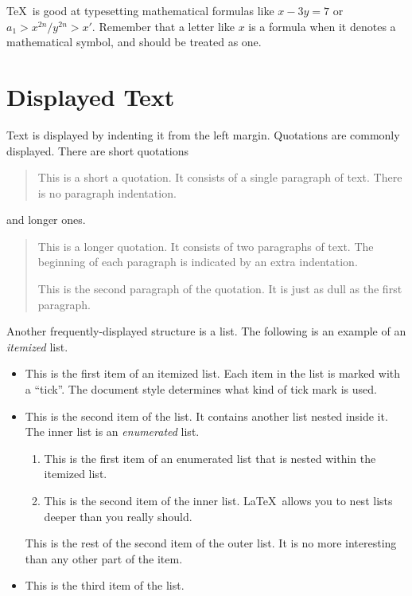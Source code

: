 \TeX\ is good at typesetting mathematical formulas like 
       \( x-3y = 7 \) 
or 
       \( a_{1} > x^{2n} / y^{2n} > x' \). 
Remember that a letter like 
       $x$        %
is a formula when it denotes a mathematical symbol, and should 
be treated as one.

\section{Displayed Text}

Text is displayed by indenting it from the left margin. 
Quotations are commonly displayed.  There are short quotations 
\begin{quote} 
   This is a short a quotation.  It consists of a 
   single paragraph of text.  There is no paragraph 
   indentation. 
\end{quote} 
and longer ones. 
\begin{quotation} 
   This is a longer quotation.  It consists of two paragraphs 
   of text.  The beginning of each paragraph is indicated 
   by an extra indentation.

   This is the second paragraph of the quotation.  It is just 
   as dull as the first paragraph. 
\end{quotation} 
Another frequently-displayed structure is a list. 
The following is an example of an {\em itemized} list. 
\begin{itemize} 
   \item  This is the first item of an itemized list.  Each item 
          in the list is marked with a ``tick''.  The document 
          style determines what kind of tick mark is used.

   \item  This is the second item of the list.  It contains another 
          list nested inside it.  The inner list is an {\em enumerated} 
          list. 
          \begin{enumerate} 
              \item This is the first item of an enumerated list that 
                    is nested within the itemized list.

              \item This is the second item of the inner list.  \LaTeX\ 
                    allows you to nest lists deeper than you really should. 
          \end{enumerate} 
          This is the rest of the second item of the outer list.  It 
          is no more interesting than any other part of the item. 
   \item  This is the third item of the list. 
\end{itemize} 
